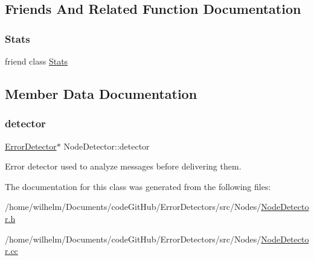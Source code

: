 \subsection{Friends And Related Function Documentation}
\mbox{\label{class_node_detector_a129f65b6976377739eb6231b6962985e}} 
\subsubsection{\texorpdfstring{Stats}{Stats}}
{\footnotesize\ttfamily friend class \hyperlink{class_stats}{Stats}\hspace{0.3cm}{\ttfamily [friend]}}



\subsection{Member Data Documentation}
\mbox{\label{class_node_detector_a711fd643dc29b74e6dfe87e1aeb1b227}} 
\subsubsection{\texorpdfstring{detector}{detector}}
{\footnotesize\ttfamily \hyperlink{class_error_detector}{Error\+Detector}$\ast$ Node\+Detector\+::detector\hspace{0.3cm}{\ttfamily [protected]}}



Error detector used to analyze messages before delivering them. 



The documentation for this class was generated from the following files\+:\begin{DoxyCompactItemize}
\item 
/home/wilhelm/\+Documents/code\+Git\+Hub/\+Error\+Detectors/src/\+Nodes/\hyperlink{_node_detector_8h}{Node\+Detector.\+h}\item 
/home/wilhelm/\+Documents/code\+Git\+Hub/\+Error\+Detectors/src/\+Nodes/\hyperlink{_node_detector_8cc}{Node\+Detector.\+cc}\end{DoxyCompactItemize}
